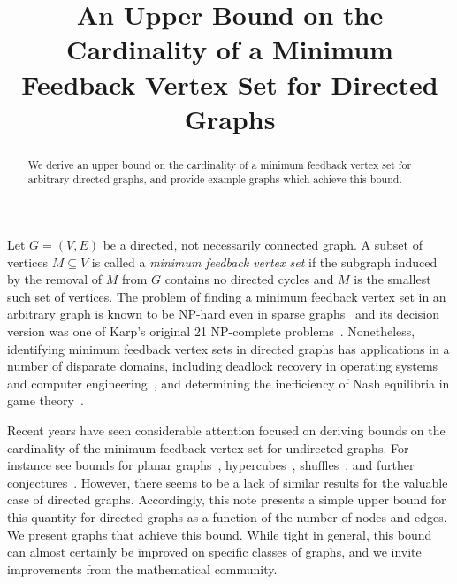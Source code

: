 \documentclass[onecolumn]{IEEETran}
\title{
An Upper Bound on the Cardinality of a Minimum Feedback Vertex Set for Directed Graphs}
\begin{document}
\maketitle

\begin{abstract} 
We derive an upper bound on the cardinality of a minimum feedback vertex set for arbitrary directed graphs, and provide example graphs which achieve this bound.
\end{abstract}





Let $G=(V,E)$ be a directed, not necessarily connected graph.
A subset of vertices $M\subseteq V$ is called a \emph{minimum feedback vertex set} if the subgraph induced by the removal of $M$ from $G$ contains no directed cycles and $M$ is the smallest such set of vertices.
The problem of finding a minimum feedback vertex set in an arbitrary graph is known to be NP-hard even in sparse graphs~\cite{Fomin2006,Borradaile2019} and its decision version was one of Karp's original 21 NP-complete problems~\cite{Karp1972}.
Nonetheless, identifying minimum feedback vertex sets in directed graphs has applications in a number of disparate domains, including deadlock recovery in operating systems and computer engineering~\cite{Lin2000}, and determining the inefficiency of Nash equilibria in game theory~\cite{Brown2019c}.


Recent years have seen considerable attention focused on deriving bounds on the cardinality of the minimum feedback vertex set for undirected graphs. For instance see bounds for planar graphs~\cite{Kelly2017}, hypercubes~\cite{Madelaine2008}, shuffles~\cite{Kralovic2003}, and further conjectures~\cite{Kowalik2010}.
However, there seems to be a lack of similar results for the valuable case of directed graphs.
Accordingly, this note presents a simple upper bound for this quantity for directed graphs as a function of the number of nodes and edges.
We present graphs that achieve this bound.
While tight in general, this bound can almost certainly be improved on specific classes of graphs, and we invite improvements from the mathematical community.
\end{document}
